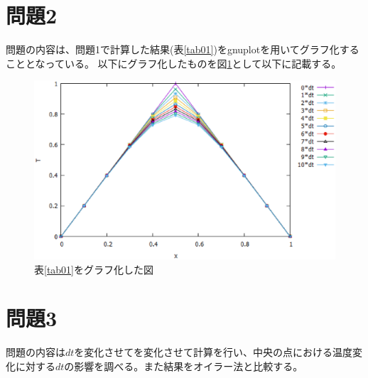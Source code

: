 \documentclass{jsarticle}
\begin{document}
\section{問題2}
問題の内容は、問題1で計算した結果(表\ref{tab01})をgnuplotを用いてグラフ化することとなっている。
以下にグラフ化したものを図\ref{fig01}として以下に記載する。
\begin{figure}[H]
	\centering
	\includegraphics[width=14cm]{pic01.eps}
	\caption{表\ref{tab01}をグラフ化した図}
	\label{fig01}
\end{figure}

\section{問題3}
問題の内容は$dt$を変化させてを変化させて計算を行い、中央の点における温度変化に対する$dt$の影響を調べる。また結果をオイラー法と比較する。
\end{document}
